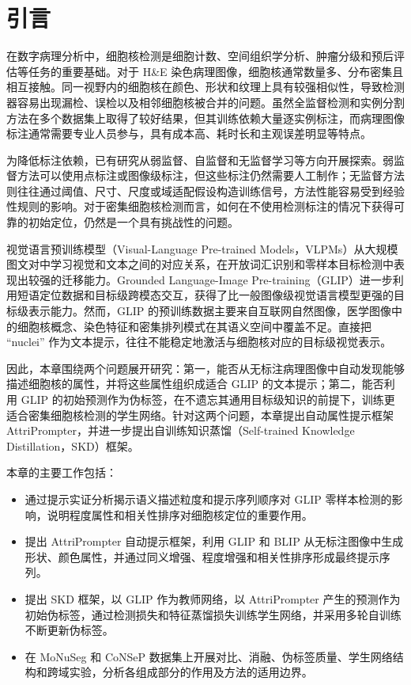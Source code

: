 \section{引言}

在数字病理分析中，细胞核检测是细胞计数、空间组织学分析、肿瘤分级和预后评估等任务的重要基础。对于 H\&E 染色病理图像，细胞核通常数量多、分布密集且相互接触。同一视野内的细胞核在颜色、形状和纹理上具有较强相似性，导致检测器容易出现漏检、误检以及相邻细胞核被合并的问题。虽然全监督检测和实例分割方法在多个数据集上取得了较好结果，但其训练依赖大量逐实例标注，而病理图像标注通常需要专业人员参与，具有成本高、耗时长和主观误差明显等特点。

为降低标注依赖，已有研究从弱监督、自监督和无监督学习等方向开展探索。弱监督方法可以使用点标注或图像级标注，但这些标注仍然需要人工制作；无监督方法则往往通过阈值、尺寸、尺度或域适配假设构造训练信号，方法性能容易受到经验性规则的影响。对于密集细胞核检测而言，如何在不使用检测标注的情况下获得可靠的初始定位，仍然是一个具有挑战性的问题。

视觉语言预训练模型（Visual-Language Pre-trained Models，VLPMs）从大规模图文对中学习视觉和文本之间的对应关系，在开放词汇识别和零样本目标检测中表现出较强的迁移能力。Grounded Language-Image Pre-training（GLIP）进一步利用短语定位数据和目标级跨模态交互，获得了比一般图像级视觉语言模型更强的目标级表示能力。然而，GLIP 的预训练数据主要来自互联网自然图像，医学图像中的细胞核概念、染色特征和密集排列模式在其语义空间中覆盖不足。直接把 ``nuclei'' 作为文本提示，往往不能稳定地激活与细胞核对应的目标级视觉表示。

因此，本章围绕两个问题展开研究：第一，能否从无标注病理图像中自动发现能够描述细胞核的属性，并将这些属性组织成适合 GLIP 的文本提示；第二，能否利用 GLIP 的初始预测作为伪标签，在不遗忘其通用目标级知识的前提下，训练更适合密集细胞核检测的学生网络。针对这两个问题，本章提出自动属性提示框架 AttriPrompter，并进一步提出自训练知识蒸馏（Self-trained Knowledge Distillation，SKD）框架。

本章的主要工作包括：
\begin{itemize}
  \item 通过提示实证分析揭示语义描述粒度和提示序列顺序对 GLIP 零样本检测的影响，说明程度属性和相关性排序对细胞核定位的重要作用。
  \item 提出 AttriPrompter 自动提示框架，利用 GLIP 和 BLIP 从无标注图像中生成形状、颜色属性，并通过同义增强、程度增强和相关性排序形成最终提示序列。
  \item 提出 SKD 框架，以 GLIP 作为教师网络，以 AttriPrompter 产生的预测作为初始伪标签，通过检测损失和特征蒸馏损失训练学生网络，并采用多轮自训练不断更新伪标签。
  \item 在 MoNuSeg 和 CoNSeP 数据集上开展对比、消融、伪标签质量、学生网络结构和跨域实验，分析各组成部分的作用及方法的适用边界。
\end{itemize}

